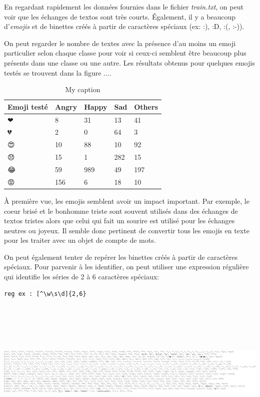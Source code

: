 En regardant rapidement les données fournies dans le fichier \emph{train.txt}, on peut voir que les échanges de textos sont très courts. Également, il y a beaucoup d'\emph{emojis} et de binettes créés à partir de caractères spéciaux (ex: :), :D, :(, :-)).

On peut regarder le nombre de textes avec la présence d'au moins un emoji particulier selon chaque classe pour voir si ceux-ci semblent être beaucoup plus présents dans une classe ou une autre. Les résultats obtenus pour quelques emojis testés se trouvent dans la figure ....

\begin{table}[]
	\centering
	\caption{My caption}
	\label{my-label}
	\begin{tabular}{@{}lllll@{}}
		\toprule
		Emoji testé & Angry & Happy & Sad & Others \\ \midrule
		❤           & 8     & 31    & 13  & 41     \\
		💔          & 2     & 0     & 64  & 3      \\
		😍          & 10    & 88    & 10  & 92     \\
		😞          & 15    & 1     & 282 & 15     \\
		😂          & 59    & 989   & 49  & 197    \\
		😡          & 156   & 6     & 18  & 10     \\ \bottomrule
	\end{tabular}
\end{table}


À première vue, les emojis semblent avoir un impact important. Par exemple, le coeur brisé et le bonhomme triste sont souvent utilisés dans des échanges de textos tristes alors que celui qui fait un sourire est utilisé pour les échanges neutres ou joyeux. Il semble donc pertinent de convertir tous les emojis en texte pour les traiter avec un objet de compte de mots.

On peut également tenter de repérer les binettes créés à partir de caractères spéciaux. Pour parvenir à les identifier, on peut utiliser une expression régulière qui identifie les séries de 2 à 6 caractères spéciaux:
\begin{verbatim}
reg ex : [^\w\s\d]{2,6}
\end{verbatim}

\includegraphics[width=\linewidth,height=7cm]{images/analyse_list_car_speciaux}

